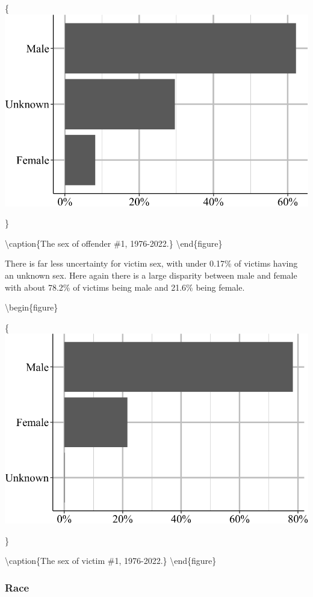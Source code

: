 \documentclass[
  12pt,
  openany]{book}
\begin{document}
\{\centering \includegraphics[width=0.9\linewidth]{06_shr_files/figure-latex/shrOffenderSex-1}

\}

\textbackslash caption\{The sex of offender \#1, 1976-2022.\}\label{fig:shrOffenderSex}
\textbackslash end\{figure\}

There is far less uncertainty for victim sex, with under 0.17\% of victims having an unknown sex. Here again there is a large disparity between male and female with about 78.2\% of victims being male and 21.6\% being female.

\textbackslash begin\{figure\}

\{\centering \includegraphics[width=0.9\linewidth]{06_shr_files/figure-latex/shrVictimSex-1}

\}

\textbackslash caption\{The sex of victim \#1, 1976-2022.\}\label{fig:shrVictimSex}
\textbackslash end\{figure\}

\subsubsection{Race}\label{race-1}
\end{document}
